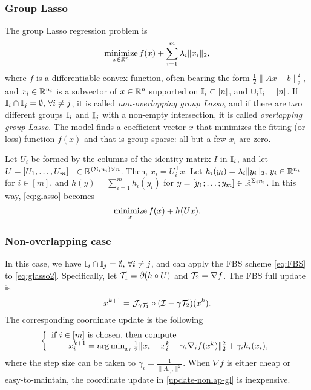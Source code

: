 \subsubsection{Group Lasso}\label{sec:glasso}
The group Lasso regression problem \cite{YL2006GrpLasso} is 
\begin{equation}\label{eq:glasso}
\Min_{x\in\RR^n}  f(x)+\sum_{i=1}^m\lambda_i\|x_i\|_2,
\end{equation} 
where $ f$ is a differentiable convex function, often bearing the form $\frac{1}{2}\|Ax-b\|_2^2$, and $x_i\in \mathbb{R}^{n_i}$ is a subvector of $x\in\mathbb{R}^n$ supported on $\mathbb{I}_i\subset [n]$, and $\cup_i \mathbb{I}_i= [n]$. If $\mathbb{I}_i\cap \mathbb{I}_j =\emptyset, \,\forall i\neq j$, it is called \emph{non-overlapping group Lasso}, and if there are two different groups $\mathbb{I}_i$ and $\mathbb{I}_j$ with a non-empty intersection, it is called \emph{overlapping group Lasso}. The model finds a coefficient vector $x$ that minimizes the fitting (or loss) function $f(x)$ and that is group sparse: all but a few $x_i$ are zero.  

Let $U_i$ be formed by the columns of the identity matrix $I$ in $\mathbb{I}_i$, and let $U=[U_1,\ldots,U_m]^\top\in\mathbb{R}^{(\Sigma_i n_i)\times n}$. Then, $x_i=U_i^\top x$. Let $h_i(y_i)=\lambda_i\|y_i\|_2,\,y_i\in\mathbb{R}^{n_i}$ for $i \in [m]$, and $h(y)=\sum_{i=1}^m h_i(y_i)$ for $y=[y_1;\ldots;y_m]\in\mathbb{R}^{\Sigma_i n_i}$. In this way, \eqref{eq:glasso} becomes
\begin{equation}\label{eq:glasso2}
\Min_x f(x)+h(Ux).
\end{equation}

\subsubsection*{Non-overlapping case~\cite{YL2006GrpLasso}} In this case, we have $\mathbb{I}_i\cap \mathbb{I}_j =\emptyset, \,\forall i\neq j$, and can apply the FBS scheme \eqref{eq:FBS} to \eqref{eq:glasso2}. Specifically, let ${\mathcal{T}}_1=\partial (h\circ U)$ and ${\mathcal{T}}_2=\nabla f$. The FBS full update is 
$$x^{k+1}={\mathcal{J}}_{\gamma {\mathcal{T}}_1}\circ({\mathcal{I}}-\gamma{\mathcal{T}}_2)(x^k).$$
The corresponding coordinate update is the following
\begin{equation}\label{update-nonlap-gl}
{\left\{
\begin{array}{l}
\text{if }i \in [m]\text{ is chosen, then compute}\\
\qquad x_i^{k+1}=\argmin_{x_i}\frac{1}{2}\|x_i-x_i^k+\gamma_i \nabla_i f(x^k)\|_2^2+ \gamma_i h_i(x_i),\\
\end{array}
\right.
}\end{equation}
where the step size can be taken to $\gamma_i=\frac{1}{\|A_{:,i}\|^2}$. When $\nabla f$ is either cheap or easy-to-maintain,  the coordinate update in \eqref{update-nonlap-gl} is inexpensive.

